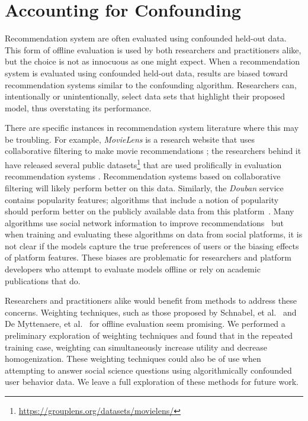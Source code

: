 \documentclass[sigconf]{acmart}
\begin{document}
\section{Accounting for Confounding}
\label{sec:confounded_eval}
Recommendation system are often evaluated using confounded held-out data.  This form of offline evaluation is used by both researchers and practitioners alike, but the choice is not as innocuous as one might expect.  
When a recommendation system is evaluated using confounded held-out data, results are biased toward recommendation systems similar to the confounding algorithm.
Researchers can, intentionally or unintentionally, select data sets that highlight their proposed model, thus overstating its performance.

There are specific instances in recommendation system literature where this may be troubling.  For example, \emph{MovieLens} is a research website that uses collaborative filtering to make movie recommendations \citep{miller2003movielens}; the researchers behind it have released several public datasets\footnote{\url{https://grouplens.org/datasets/movielens/}} that are used prolifically in evaluation recommendation systems \citep{harper2016movielens}.  Recommendation systems based on collaborative filtering will likely perform better on this data.
Similarly, the \emph{Douban} service contains popularity features; algorithms that include a notion of popularity should perform better on the publicly available data from this platform~\cite{hao:sr}.
Many algorithms use social network information to improve recommendations~\cite{Chaney:2015,guo2015trustsvd,hao:sr} but when training and evaluating these algorithms on data from social platforms, it is not clear if the models capture the true preferences of users or the biasing effects of platform features.
These biases are problematic for researchers and platform developers who attempt to evaluate models offline or rely on academic publications that do.

Researchers and practitioners alike would benefit from methods to address these concerns.  Weighting techniques, such as those proposed by 
Schnabel, et al.~\cite{schnabel2016recommendations} and De Myttenaere, et al.~\cite{de2014reducing} for offline evaluation seem promising.  We performed a preliminary exploration of weighting techniques and found that in the repeated training case, weighting can simultaneously increase utility and decrease homogenization.  These weighting techniques could also be of use when attempting to answer social science questions using algorithmically confounded user behavior data.  We leave a full exploration of these methods for future work. 
\end{document}
